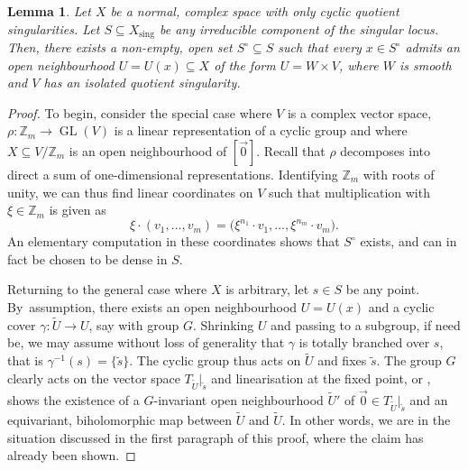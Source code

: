 \documentclass[11pt]{article}
\theoremstyle{plain}
\newtheorem{lem}[thm]{Lemma}
\theoremstyle{definition}
\numberwithin{equation}{thm}
\numberwithin{enumi}{thm}
\DeclareMathOperator{\sing}{sing}
\DeclareMathOperator{\GL}{GL}
\newcommand{\bZ}{\mathbb{Z}}
\let\wtilde\widetilde
\begin{document}
\begin{lem}\label{lem:glcs}
Let $X$ be a normal, complex space with only cyclic quotient singularities.
Let $S \subseteq X_{\sing}$ be any irreducible component of the singular locus. Then,
there exists a non-empty, open set $S^\circ \subseteq S$ such that every $x \in S^\circ$ admits an
open neighbourhood $U=U(x) \subseteq X$ of the form $U = W \times V$, where $W$ is smooth
and $V$ has an isolated quotient singularity.
\end{lem}
\begin{proof}
To begin, consider the special case where $V$ is a complex vector space,
$\rho : \bZ_m \to \GL(V)$ is a linear representation of a cyclic group and where
$X \subseteq V / \bZ_m$ is an open neighbourhood of $[\vec 0]$. Recall that $\rho$
decomposes into direct a sum of one-dimensional representations. Identifying
$\bZ_m$ with roots of unity, we can thus find linear coordinates on $V$ such
that multiplication with $\xi \in \bZ_m$ is given as
\[
\xi\cdot (v_1, \dots, v_m) = \bigl(\xi^{n_1}\cdot v_1, \dots, \xi^{n_m}\cdot v_m\bigr).
\]
An elementary computation in these coordinates shows that $S^\circ$ exists, and can
in fact be chosen to be dense in $S$.

Returning to the general case where $X$ is arbitrary, let $s \in S$ be any
point. By~assumption, there exists an open neighbourhood $U = U(x)$ and a
cyclic cover $\gamma : \wtilde U \to U$, say with group $G$. Shrinking $U$ and
passing to a subgroup, if need be, we may assume without loss of generality
that $\gamma$ is totally branched over $s$, that is $\gamma^{-1}(s) = \{ \wtilde s \}$.
The cyclic group thus acts on $\wtilde U$ and fixes $\wtilde s$. The group
$G$ clearly acts on the vector space $T_{\wtilde U}|_{\wtilde s}$ and
linearisation at the fixed point, \cite[Proof of Th.\,4]{MR0084174} or
\cite[Cor.\,2 on p.\,13]{MR782881}, shows the existence of a $G$-invariant open
neighbourhood $\wtilde U'$ of $\vec 0 \in T_{\wtilde U}|_{\wtilde s}$ and an
equivariant, biholomorphic map between $\wtilde U$ and $\wtilde U$. In other
words, we are in the situation discussed in the first paragraph of this proof,
where the claim has already been shown.
\end{proof}
\end{document}
